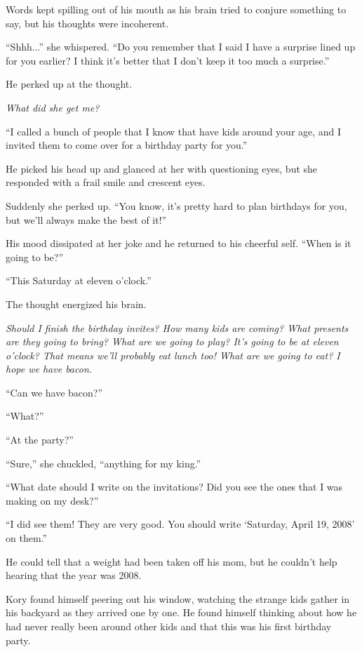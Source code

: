 Words kept spilling out of his mouth as his brain tried to conjure something to say, but his thoughts were incoherent.

``Shhh...'' she whispered. ``Do you remember that I said I have a surprise lined up for you earlier? I think it's better that I don't keep it too much a surprise.''

He perked up at the thought.

\textit{What did she get me?}

``I called a bunch of people that I know that have kids around your age, and I invited them to come over for a birthday party for you.''

He picked his head up and glanced at her with questioning eyes, but she responded with a frail smile and crescent eyes.

Suddenly she perked up. ``You know, it's pretty hard to plan birthdays for you, but we'll always make the best of it!''

His mood dissipated at her joke and he returned to his cheerful self. ``When is it going to be?''

``This Saturday at eleven o'clock.''

The thought energized his brain.

\textit{Should I finish the birthday invites? How many kids are coming? What presents are they going to bring? What are we going to play? It's going to be at eleven o'clock? That means we'll probably eat lunch too! What are we going to eat? I hope we have bacon.}

``Can we have bacon?''

``What?''

``At the party?''

``Sure,'' she chuckled, ``anything for my king.''

``What date should I write on the invitations? Did you see the ones that I was making on my desk?''

``I did see them! They are very good. You should write `Saturday, April 19, 2008' on them.''

He could tell that a weight had been taken off his mom, but he couldn't help hearing that the year was 2008.

\line


Kory found himself peering out his window, watching the strange kids gather in his backyard as they arrived one by one. He found himself thinking about how he had never really been around other kids and that this was his first birthday party.

